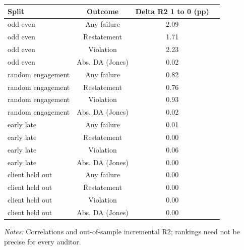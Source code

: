 \documentclass[10pt]{article}
\begin{document}
\begin{minipage}{19cm}\fontsize{10}{12}\selectfont\setlength{\tabcolsep}{4pt}\renewcommand{\arraystretch}{1.12}


\centering
{}
\begin{threeparttable}
\begin{tabular}{p{}ccc}
\toprule
Split & Outcome & Delta R2 1 to 0 (pp) &  \\
\midrule
odd even & Any failure & 2.09 &  \\
odd even & Restatement & 1.71 &  \\
odd even & Violation & 2.23 &  \\
odd even & Abs. DA (Jones) & 0.02 &  \\
random engagement & Any failure & 0.82 &  \\
random engagement & Restatement & 0.76 &  \\
random engagement & Violation & 0.93 &  \\
random engagement & Abs. DA (Jones) & 0.02 &  \\
early late & Any failure & 0.01 &  \\
early late & Restatement & 0.00 &  \\
early late & Violation & 0.06 &  \\
early late & Abs. DA (Jones) & 0.00 &  \\
client held out & Any failure & 0.00 &  \\
client held out & Restatement & 0.00 &  \\
client held out & Violation & 0.00 &  \\
client held out & Abs. DA (Jones) & 0.00 &  \\
\bottomrule
\end{tabular}
\begin{tablenotes}\fontsize{9}{11}\selectfont
\item \raggedright \fontsize{9}{11}\selectfont \textit{Notes:} Correlations and out-of-sample incremental R2; rankings need not be precise for every auditor.
\end{tablenotes}
\end{threeparttable}

\end{minipage}
\end{document}
